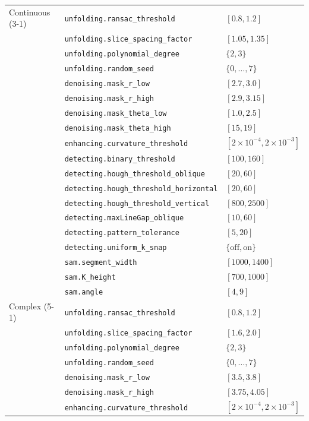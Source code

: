 \documentclass[a4paper,fleqn]{cas-dc}
\begin{document}
{\begin{table}[t]
{\begin{tabular*}{\textwidth}{@{\extracolsep{\fill}} llp{} @{}}
\addlinespace
Continuous (3-1) & \texttt{unfolding.ransac\_threshold} & $[0.8,1.2]$ \\
 & \texttt{unfolding.slice\_spacing\_factor} & $[1.05,1.35]$ \\
 & \texttt{unfolding.polynomial\_degree} & $\{2,3\}$ \\
 & \texttt{unfolding.random\_seed} & $\{0,\ldots,7\}$ \\
 & \texttt{denoising.mask\_r\_low} & $[2.7,3.0]$ \\
 & \texttt{denoising.mask\_r\_high} & $[2.9,3.15]$ \\
 & \texttt{denoising.mask\_theta\_low} & $[1.0,2.5]$ \\
 & \texttt{denoising.mask\_theta\_high} & $[15,19]$ \\
 & \texttt{enhancing.curvature\_threshold} & $[2{\times}10^{-4},2{\times}10^{-3}]$ \\
 & \texttt{detecting.binary\_threshold} & $[100,160]$ \\
 & \texttt{detecting.hough\_threshold\_oblique} & $[20,60]$ \\
 & \texttt{detecting.hough\_threshold\_horizontal} & $[20,60]$ \\
 & \texttt{detecting.hough\_threshold\_vertical} & $[800,2500]$ \\
 & \texttt{detecting.maxLineGap\_oblique} & $[10,60]$ \\
 & \texttt{detecting.pattern\_tolerance} & $[5,20]$ \\
 & \texttt{detecting.uniform\_k\_snap} & $\{\mathrm{off},\mathrm{on}\}$ \\
 & \texttt{sam.segment\_width} & $[1000,1400]$ \\
 & \texttt{sam.K\_height} & $[700,1000]$ \\
 & \texttt{sam.angle} & $[4,9]$ \\
\addlinespace
Complex (5-1) & \texttt{unfolding.ransac\_threshold} & $[0.8,1.2]$ \\
 & \texttt{unfolding.slice\_spacing\_factor} & $[1.6,2.0]$ \\
 & \texttt{unfolding.polynomial\_degree} & $\{2,3\}$ \\
 & \texttt{unfolding.random\_seed} & $\{0,\ldots,7\}$ \\
 & \texttt{denoising.mask\_r\_low} & $[3.5,3.8]$ \\
 & \texttt{denoising.mask\_r\_high} & $[3.75,4.05]$ \\
 & \texttt{enhancing.curvature\_threshold} & $[2{\times}10^{-4},2{\times}10^{-3}]$ \\

\end{tabular*}}
\end{table}}
\end{document}

